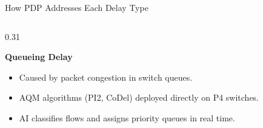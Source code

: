 {\begin{frame}{How PDP Addresses Each Delay Type}
\begin{columns}[T, totalwidth=\textwidth]
    \begin{column}{0.31\textwidth}
      \begin{tcolorbox}[problemcard=solutiongreen]
        {\color{solutiongreen}\bfseries\small
          Queueing Delay}
        \vspace{4pt}
        \begin{itemize}
          \setlength\itemsep{3pt}
          \fontsize{7}{8}\selectfont\color{HUAdark}
          \item Caused by packet congestion
                in switch queues.
          \item AQM algorithms (PI2, CoDel)
                deployed directly on P4
                switches.
          \item AI classifies flows and
                assigns priority queues
                in real time.
        \end{itemize}
      \end{tcolorbox}
    \end{column}

  \end{columns}

\end{frame}
}